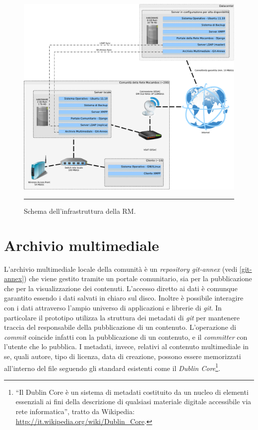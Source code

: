 \begin{figure}[htbp]
  \centering
  \includegraphics[width=\textwidth]{./Figure/SchemaServer_ReteMocambos-crop.pdf}
  \rule{35em}{0.5pt}
  \caption[Schema dell'infrastruttura della RM]{Schema dell'infrastruttura della RM.}
  \label{fig:SchemaServer_ReteMocambos}
\end{figure}


\section{Archivio multimediale}
L'archivio multimediale locale della comunità è un \emph{repository
  git-annex} (vedi \ref{git-annex}) che viene gestito tramite un
portale comunitario, sia per la pubblicazione che per la
visualizzazione dei contenuti. L'accesso diretto ai dati è comunque
garantito essendo i dati salvati in chiaro sul disco. Inoltre è
possibile interagire con i dati attraverso l'ampio universo di
applicazioni e librerie di \emph{git}. In particolare il prototipo
utilizza la struttura dei metadati di \emph{git} per mantenere traccia
del responsabile della pubblicazione di un contenuto. L'operazione di
\emph{commit} coincide infatti con la pubblicazione di un contenuto, e
il \emph{committer} con l'utente che lo pubblica. I metadati, invece,
relativi al contenuto multimediale in se, quali autore, tipo di
licenza, data di creazione, possono essere memorizzati all'interno del
file seguendo gli standard esistenti come il \emph{Dublin
  Core}\footnote{``Il Dublin Core è un sistema di metadati costituito
  da un nucleo di elementi essenziali ai fini della descrizione di
  qualsiasi materiale digitale accessibile via rete informatica'',
  tratto da Wikipedia:
  \url{http://it.wikipedia.org/wiki/Dublin_Core}.}.

